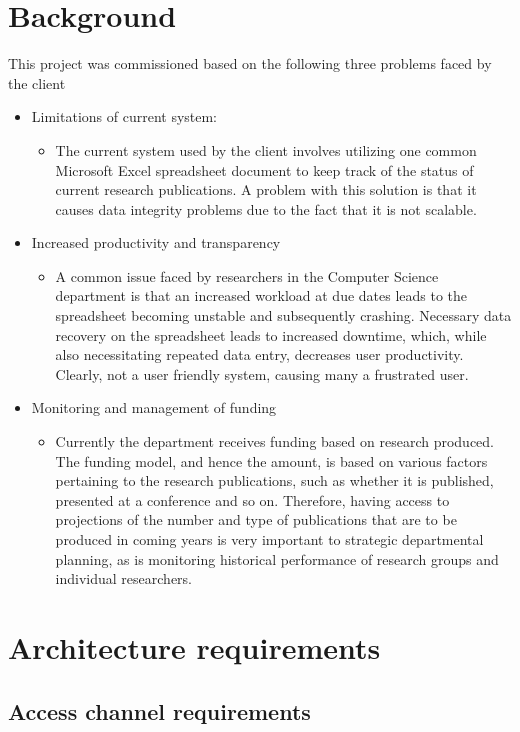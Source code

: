 \documentclass[a4paper,10pt]{article}
\begin{document}
\section{Background}
This project was commissioned based on the following three problems faced by the client
\begin{itemize}
\item Limitations of current system:
	\begin{itemize}
	\item The current system used by the client involves utilizing one common Microsoft Excel spreadsheet document to keep track of the status of current research publications. A problem with this solution is that it causes data integrity problems due to the fact that it is not scalable.
	\end{itemize}
\item Increased productivity and transparency
	\begin{itemize}
	\item  A common issue faced by researchers in the Computer Science department is that an increased workload at due dates leads to the spreadsheet becoming unstable and subsequently crashing. Necessary data recovery on the spreadsheet leads to increased downtime, which, while also necessitating repeated data entry, decreases user productivity. Clearly, not a user friendly system, causing many a frustrated user.
	\end{itemize}

\item Monitoring and management of funding
	\begin{itemize}
	\item Currently the department receives funding based on research produced. The funding model, and hence the amount, is based on various factors pertaining to the research publications, such as whether it is published, presented at a conference and so on. Therefore, having access to projections of the number and type of publications that are to be produced in coming years is very important to strategic departmental planning, as is monitoring historical performance of research groups and individual researchers.
	\end{itemize}
\end{itemize}

\section{Architecture requirements}
\subsection{Access channel requirements}
\end{document}
